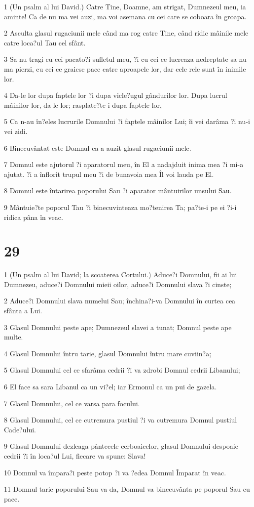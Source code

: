 \par 1 (Un psalm al lui David.) Catre Tine, Doamne, am strigat, Dumnezeul meu, ia aminte! Ca de nu ma vei auzi, ma voi asemana cu cei care se coboara în groapa.
\par 2 Asculta glasul rugaciunii mele când ma rog catre Tine, când ridic mâinile mele catre loca?ul Tau cel sfânt.
\par 3 Sa nu tragi cu cei pacato?i sufletul meu, ?i cu cei ce lucreaza nedreptate sa nu ma pierzi, cu cei ce graiesc pace catre aproapele lor, dar cele rele sunt în inimile lor.
\par 4 Da-le lor dupa faptele lor ?i dupa vicle?ugul gândurilor lor. Dupa lucrul mâinilor lor, da-le lor; rasplate?te-i dupa faptele lor,
\par 5 Ca n-au în?eles lucrurile Domnului ?i faptele mâinilor Lui; îi vei darâma ?i nu-i vei zidi.
\par 6 Binecuvântat este Domnul ca a auzit glasul rugaciunii mele.
\par 7 Domnul este ajutorul ?i aparatorul meu, în El a nadajduit inima mea ?i mi-a ajutat. ?i a înflorit trupul meu ?i de bunavoia mea Îl voi lauda pe El.
\par 8 Domnul este întarirea poporului Sau ?i aparator mântuirilor unsului Sau.
\par 9 Mântuie?te poporul Tau ?i binecuvinteaza mo?tenirea Ta; pa?te-i pe ei ?i-i ridica pâna în veac.

\chapter{29}

\par 1 (Un psalm al lui David; la scoaterea Cortului.) Aduce?i Domnului, fii ai lui Dumnezeu, aduce?i Domnului mieii oilor, aduce?i Domnului slava ?i cinste;
\par 2 Aduce?i Domnului slava numelui Sau; închina?i-va Domnului în curtea cea sfânta a Lui.
\par 3 Glasul Domnului peste ape; Dumnezeul slavei a tunat; Domnul peste ape multe.
\par 4 Glasul Domnului întru tarie, glasul Domnului întru mare cuviin?a;
\par 5 Glasul Domnului cel ce sfarâma cedrii ?i va zdrobi Domnul cedrii Libanului;
\par 6 El face sa sara Libanul ca un vi?el; iar Ermonul ca un pui de gazela.
\par 7 Glasul Domnului, cel ce varsa para focului.
\par 8 Glasul Domnului, cel ce cutremura pustiul ?i va cutremura Domnul pustiul Cade?ului.
\par 9 Glasul Domnului dezleaga pântecele cerboaicelor, glasul Domnului despoaie cedrii ?i în loca?ul Lui, fiecare va spune: Slava!
\par 10 Domnul va împara?i peste potop ?i va ?edea Domnul Împarat în veac.
\par 11 Domnul tarie poporului Sau va da, Domnul va binecuvânta pe poporul Sau cu pace.

